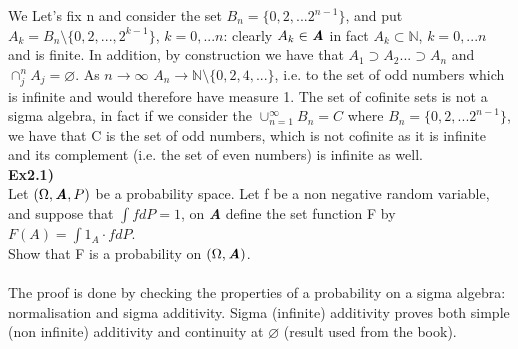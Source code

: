 \documentclass[12pt,mythesisstyle]{report}
\begin{document}
We Let's fix n and consider the set \(B_n=\{0,2,...2^{n-1}\}\), and put \(A_k=B_n\setminus\{0,2,...,2^{k-1}\}\), \(k=0,...n\): clearly \(A_k\in\textbf{\textit{A}}\) in fact \(A_k\subset\mathbb{N}\), \(k=0,...n\) and is finite. In addition, by construction we have that \(A_1\supset A_2...\supset A_n\) and $\cap_{j}^n A_j=\varnothing$. As \(n\rightarrow\infty\) $A_n\rightarrow\mathbb{N}\setminus\{0,2,4,...\}$, i.e. to the set of odd numbers which is infinite and would therefore have measure 1. The set of cofinite sets is not a sigma algebra, in fact if we consider the \(\cup_{n=1}^\infty B_n=C\) where $B_n=\{0,2,...2^{n-1}\}$, we have that C is the set of odd numbers, which is not cofinite as it is infinite and its complement (i.e. the set of even numbers) is infinite as well.
\\
\textbf{Ex2.1)}\\
Let $(\Omega, \textbf{\textit{A}}, P)$ be a probability space. Let f be a non negative random variable, and suppose that $\int fdP=1$, on \textbf{\textit{A}} define the set function F by $F(A)=\int1_A\cdot fdP$.
\\
Show that F is a probability on $(\Omega, \textbf{\textit{A}})$.
\\
\\The proof is done by checking the properties of a probability on a sigma algebra: normalisation and sigma additivity. Sigma (infinite) additivity proves both simple (non infinite) additivity and continuity at $\varnothing$ (result used from the book).
\end{document}
